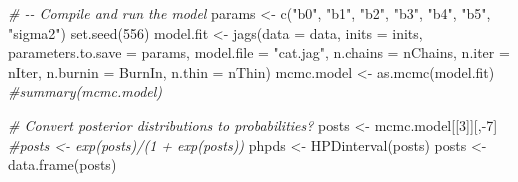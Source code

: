 \documentclass[12pt]{article}
\newenvironment{Shaded}{\begin{snugshade}}{\end{snugshade}}
\newcommand{\AttributeTok}[1]{\textcolor[rgb]{0.77,0.63,0.00}{#1}}
\newcommand{\CommentTok}[1]{\textcolor[rgb]{0.56,0.35,0.01}{\textit{#1}}}
\newcommand{\DecValTok}[1]{\textcolor[rgb]{0.00,0.00,0.81}{#1}}
\newcommand{\FunctionTok}[1]{\textcolor[rgb]{0.00,0.00,0.00}{#1}}
\newcommand{\NormalTok}[1]{#1}
\newcommand{\OtherTok}[1]{\textcolor[rgb]{0.56,0.35,0.01}{#1}}
\newcommand{\SpecialCharTok}[1]{\textcolor[rgb]{0.00,0.00,0.00}{#1}}
\newcommand{\StringTok}[1]{\textcolor[rgb]{0.31,0.60,0.02}{#1}}
\begin{document}
\begin{Shaded}
\begin{Highlighting}[]
\CommentTok{\# {-}{-} Compile and run the model}
\NormalTok{params }\OtherTok{\textless{}{-}} \FunctionTok{c}\NormalTok{(}\StringTok{"b0"}\NormalTok{, }\StringTok{"b1"}\NormalTok{, }\StringTok{"b2"}\NormalTok{, }\StringTok{"b3"}\NormalTok{, }\StringTok{"b4"}\NormalTok{, }\StringTok{"b5"}\NormalTok{, }\StringTok{"sigma2"}\NormalTok{)}
\FunctionTok{set.seed}\NormalTok{(}\DecValTok{556}\NormalTok{)}
\NormalTok{model.fit }\OtherTok{\textless{}{-}} \FunctionTok{jags}\NormalTok{(}\AttributeTok{data =}\NormalTok{ data,}
                  \AttributeTok{inits =}\NormalTok{ inits,}
                  \AttributeTok{parameters.to.save =}\NormalTok{ params,}
                  \AttributeTok{model.file =} \StringTok{"cat.jag"}\NormalTok{,}
                  \AttributeTok{n.chains =}\NormalTok{ nChains,}
                  \AttributeTok{n.iter =}\NormalTok{ nIter,}
                  \AttributeTok{n.burnin =}\NormalTok{ BurnIn,}
                  \AttributeTok{n.thin =}\NormalTok{ nThin)}
\NormalTok{mcmc.model }\OtherTok{\textless{}{-}} \FunctionTok{as.mcmc}\NormalTok{(model.fit)}
\CommentTok{\#summary(mcmc.model)}

\CommentTok{\# Convert posterior distributions to probabilities?}
\NormalTok{posts }\OtherTok{\textless{}{-}}\NormalTok{ mcmc.model[[}\DecValTok{3}\NormalTok{]][,}\SpecialCharTok{{-}}\DecValTok{7}\NormalTok{] }
\CommentTok{\#posts \textless{}{-} exp(posts)/(1 + exp(posts))}
\NormalTok{phpds }\OtherTok{\textless{}{-}} \FunctionTok{HPDinterval}\NormalTok{(posts)}
\NormalTok{posts }\OtherTok{\textless{}{-}} \FunctionTok{data.frame}\NormalTok{(posts)}


\end{Highlighting}
\end{Shaded}
\end{document}
